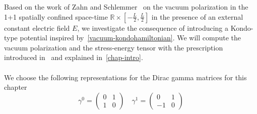 Based on the work of Zahn and Schlemmer~\cite{Zahn2015} on the vacuum polarization in the 1+1 spatially confined space-time $\mathbb{R}\times[-\frac{L}{2}, \frac L 2]$ in the presence of an external constant electric field $E$,
we investigate the consequence of introducing a Kondo-type potential inspired by~\cref{vacuum-kondohamiltonian}.
We will compute the vacuum polarization and the stress-energy tensor with the prescription introduced in~\cite{Zahn2015} and explained in~\cref{chap-intro}.\\\\
We choose the following representations for the Dirac gamma matrices for this chapter
\begin{equation*}
\gamma^0 = \begin{pmatrix}
0 & 1 \\
1 & 0 \end{pmatrix}  \quad  \gamma^1 = \begin{pmatrix}
0  & 1 \\
-1 & 0
\end{pmatrix}
\end{equation*}
%
